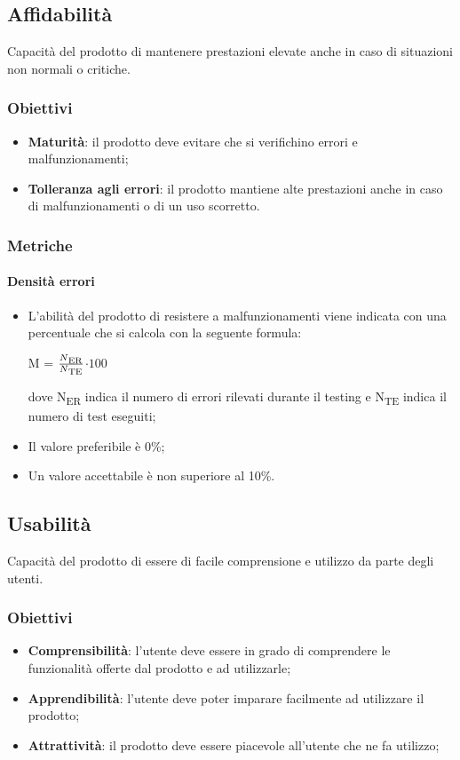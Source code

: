 	\subsection{Affidabilità}
	Capacità del prodotto di mantenere prestazioni elevate anche in caso di situazioni non normali o critiche.
		\subsubsection{Obiettivi}
		\begin{itemize}
			\item \textbf{Maturità}: il prodotto deve evitare che si verifichino errori e malfunzionamenti;
			\item \textbf{Tolleranza agli errori}: il prodotto mantiene alte prestazioni anche in caso di malfunzionamenti o di un uso scorretto.
		\end{itemize}
		\subsubsection{Metriche}
			\paragraph{Densità errori}
			\begin{itemize}
			\item L'abilità del prodotto di resistere a malfunzionamenti viene indicata con una percentuale che si calcola con la seguente formula: \\
			\centerline{ M =  \(\frac{N\textsubscript{ER}}{N\textsubscript{TE}} \)$ \cdot 100$ }
			dove N\textsubscript{ER} indica il numero di errori rilevati durante il testing e N\textsubscript{TE} indica il numero di test eseguiti;
			\item Il valore preferibile è 0\%;
			\item Un valore accettabile è non superiore al 10\%.
			\end{itemize}
	\subsection{Usabilità}
	Capacità del prodotto di essere di facile comprensione e utilizzo da parte degli utenti.
		\subsubsection{Obiettivi}
		\begin{itemize}
			\item \textbf{Comprensibilità}: l'utente deve essere in grado di comprendere le funzionalità offerte dal prodotto e ad utilizzarle;
			\item \textbf{Apprendibilità}: l'utente deve poter imparare facilmente ad utilizzare il prodotto;
			\item \textbf{Attrattività}: il prodotto deve essere piacevole all'utente che ne fa utilizzo;
		\end{itemize}
